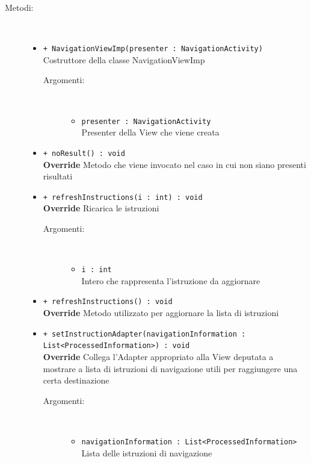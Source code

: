 \documentclass[../DefinizioneDiProdotto.tex]{subfiles}
\begin{document}
\begin{description}
\begin{itemize}
	\end{itemize}
	\item[Metodi:] \
	\begin{itemize}
		\item \texttt{+ NavigationViewImp(presenter : NavigationActivity)}\\
		Costruttore della classe NavigationViewImp
		\begin{description}
			\item[Argomenti:] \
			\begin{itemize}
				\item \texttt{presenter : NavigationActivity}\\
				Presenter della View che viene creata\end{itemize}
		\end{description}
		\item \texttt{+ noResult() : void}\\
		\textbf{Override} Metodo che viene invocato nel caso in cui non siano presenti risultati
		\item \texttt{+ refreshInstructions(i : int) : void}\\
		\textbf{Override} Ricarica le istruzioni
		\begin{description}
			\item[Argomenti:] \
			\begin{itemize}
				\item \texttt{i : int}\\
				Intero che rappresenta l'istruzione da aggiornare\end{itemize}
		\end{description}
		\item \texttt{+ refreshInstructions() : void}\\
		\textbf{Override} Metodo utilizzato per aggiornare la lista di istruzioni
		\item \texttt{+ setInstructionAdapter(navigationInformation : List<ProcessedInformation>) : void}\\
		\textbf{Override} Collega l'Adapter appropriato alla View deputata a mostrare a lista di istruzioni di navigazione utili per raggiungere una certa destinazione
		\begin{description}
			\item[Argomenti:] \
			\begin{itemize}
				\item \texttt{navigationInformation : List<ProcessedInformation>}\\
				Lista delle istruzioni di navigazione\end{itemize}

\end{description}
\end{itemize}
\end{description}
\end{document}
